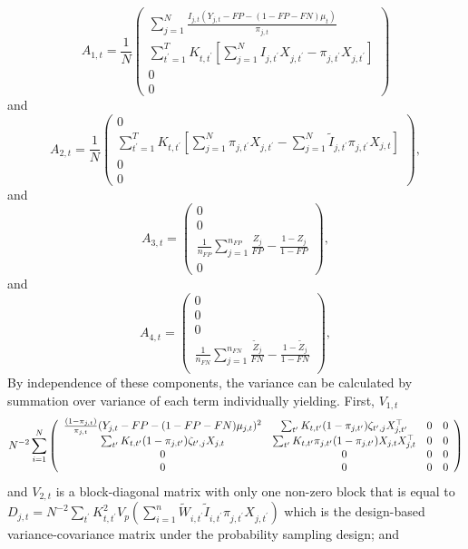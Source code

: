 \documentclass[11pt]{amsart}
\numberwithin{equation}{section}
\theoremstyle{plain}
\begin{document}
$$
A_{1,t} = \frac{1}{N} \left( \begin{array}{c}
\sum_{j=1}^N \frac{I_{j,t} (Y_{j,t} - FP - (1-FP-FN) \mu_t)}{\pi_{j,t}} \\
\sum_{t^\prime = 1}^T K_{t,t^\prime} \left[ \sum_{j=1}^N I_{j,t^\prime} X_{j,t^\prime} - \pi_{j,t^\prime} X_{j,t^\prime} \right] \\
0 \\
0
\end{array}
\right)
$$
and
$$
A_{2,t} = \frac{1}{N} \left( \begin{array}{c}
0 \\
\sum_{t^\prime = 1}^T K_{t,t^\prime} \left[ \sum_{j=1}^N \pi_{j,t^\prime} X_{j,t^\prime} - \sum_{j=1}^N \tilde I_{j,t^\prime} \pi_{j,t^\prime} X_{j,t} \right] \\
0 \\
0
\end{array}
\right),
$$
and
$$
A_{3,t} = \left( \begin{array}{c}
0 \\
0 \\
\frac{1}{n_{FP}} \sum_{j=1}^{n_{FP}} \frac{Z_j}{FP} - \frac{1-Z_j}{1-FP} \\
0
\end{array}
\right),
$$
and
$$
A_{4,t} = \left( \begin{array}{c}
0 \\
0 \\
0 \\
\frac{1}{n_{FN}} \sum_{j=1}^{n_{FN}} \frac{\tilde Z_j}{FN} - \frac{1-\tilde Z_j}{1-FN} \\
\end{array}
\right),
$$
By independence of these components, the variance can be calculated by summation over variance of each term individually yielding. First, $V_{1,t}$
{
\tiny
$$
 N^{-2} \sum_{i=1}^N \left(
\begin{array}{c c c c}
\frac{(1-\pi_{j,t})}{\pi_{j,t}} (Y_{j,t} - FP - (1-FP-FN) \mu_{j,t})^2 & \sum_{t^\prime} K_{t,t^\prime} (1-\pi_{j,t^\prime}) \zeta_{t^\prime, j} X_{j,t^\prime}^\top & 0 & 0 \\
\sum_{t^\prime} K_{t,t^\prime} (1-\pi_{j,t^\prime}) \zeta_{t^\prime, j} X_{j,t}&
\sum_{t^\prime} K_{t,t^\prime} \pi_{j,t^\prime} (1-\pi_{j,t^\prime}) X_{j,t} X_{j,t}^\top
& 0 & 0 \\
0 & 0 & 0 & 0 \\
0 & 0 & 0 & 0 \\
\end{array}
\right)
$$
}
and $V_{2,t}$ is a block-diagonal matrix with only one non-zero block that is equal to $D_{j,t} = N^{-2} \sum_{t^\prime} K_{t,t^\prime}^2 V_p\left( \sum_{i=1}^n \tilde W_{i,t^\prime} \tilde I_{i,t^\prime}  \pi_{j,t^\prime} X_{j,t^\prime} \right)$ which is the design-based variance-covariance matrix under the probability sampling design; and
\end{document}
